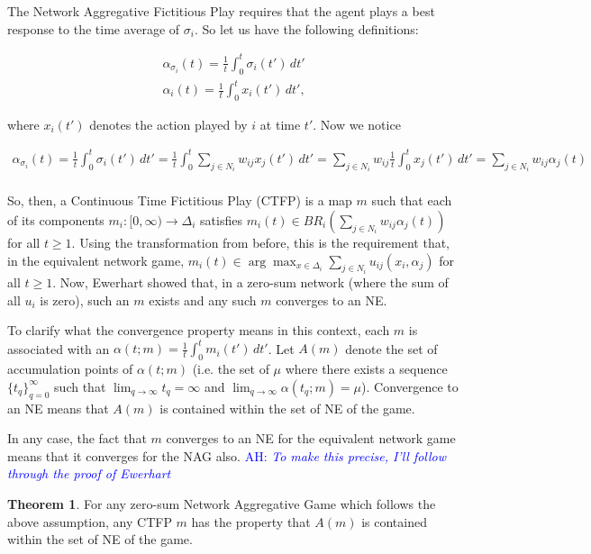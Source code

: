 \documentclass{article}
\theoremstyle{definition}
\newtheorem{theorem}{Theorem}
\newcommand{\ah}[1]{\textcolor{blue}{AH: \textit{#1}}}
\begin{document}
	The Network Aggregative Fictitious Play requires that the agent plays a best response to the time average of $\sigma_i$. So let us have the following definitions:
	
	\begin{align}
		\alpha_{\sigma_i}(t) = \frac{1}{t} \int_{0}^{t} \sigma_i(t') \, dt'\nonumber \\
		\alpha_i(t) = \frac{1}{t} \int_{0}^{t} x_i(t') \, dt', \nonumber
	\end{align}
	
	where $x_i(t')$ denotes the action played by $i$ at time $t'$. Now we notice
	
	\begin{align}
		\alpha_{\sigma_i}(t) = \frac{1}{t} \int_{0}^{t} \sigma_i(t') \, dt' = \frac{1}{t} \int_{0}^t \sum_{j \in N_i} w_{ij} x_j(t') \, dt' = \sum_{j \in N_i} w_{ij} \frac{1}{t} \int_{0}^t x_j(t') \, dt' = \sum_{j \in N_i} w_{ij} \alpha_j(t) \nonumber \\
	\end{align}
	
	So, then, a Continuous Time Fictitious Play (CTFP) is a map $m$ such that each of its components $m_i: [0, \infty) \rightarrow \Delta_i$ satisfies $m_i(t) \in BR_i(\sum_{j \in N_i} w_{ij} \alpha_j(t))$ for all $t \geq 1$. Using the transformation from before, this is the requirement that, in the equivalent network game, $m_i(t) \in \arg \max_{x \in \Delta_i} \sum_{j \in N_i} u_{ij}(x_i, \alpha_j)$ for all $t \geq 1$. Now, Ewerhart showed that, in a zero-sum network (where the sum of all $u_i$ is zero), such an $m$ exists and any such $m$ converges to an NE.
	
	To clarify what the convergence property means in this context, each $m$ is associated with an $\alpha(t; m) = \frac{1}{t} \int_{0}^t m_i(t') \, dt'$. Let $A(m)$ denote the set of accumulation points of $\alpha(t; m)$ (i.e. the set of $\mu$ where there exists a sequence $\{t_q\}_{q = 0}^{\infty}$ such that $\lim_{q \rightarrow \infty} t_q = \infty$ and $\lim_{q \rightarrow \infty} \alpha(t_q; m) = \mu$). Convergence to an NE means that $A(m)$ is contained within the set of NE of the game. 
	
	In any case, the fact that $m$ converges to an NE for the equivalent network game means that it converges for the NAG also. \ah{To make this precise, I'll follow through the proof of Ewerhart}
	
	\begin{theorem}
		For any zero-sum Network Aggregative Game which follows the above assumption, any CTFP $m$ has the property that $A(m)$ is contained within the set of NE of the game.
	\end{theorem}
	
\end{document}
